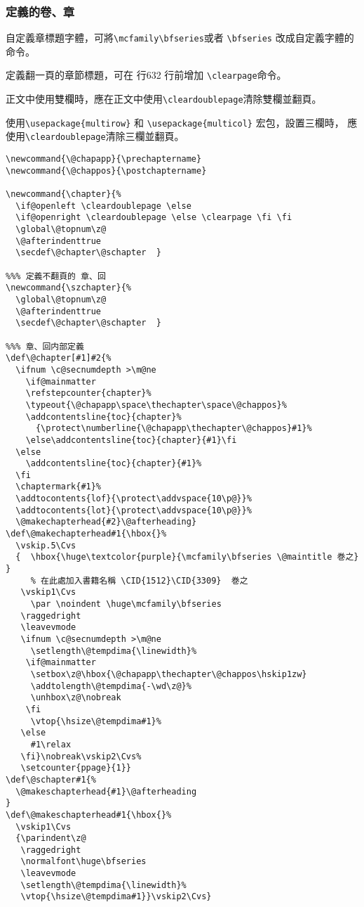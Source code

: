 \subsubsection{定義的卷、章}

\par 自定義章標題字體，可將\verb+\mcfamily\bfseries+或者 \verb+\bfseries+
改成自定義字體的命令。
\par 定義翻一頁的章節標題，可在 行632 行前增加 \verb+\clearpage+命令。
\par 正文中使用雙欄時，應在正文中使用\verb+\cleardoublepage+清除雙欄並翻頁。
\par 使用\verb+\usepackage{multirow}+ 和 \verb+\usepackage{multicol}+ 宏包，設置三欄時，
應使用\verb+\cleardoublepage+清除三欄並翻頁。
\begin{lstlisting}[firstnumber=620]
\newcommand{\@chapapp}{\prechaptername}
\newcommand{\@chappos}{\postchaptername}

\newcommand{\chapter}{%
  \if@openleft \cleardoublepage \else
  \if@openright \cleardoublepage \else \clearpage \fi \fi
  \global\@topnum\z@
  \@afterindenttrue
  \secdef\@chapter\@schapter  }

%%% 定義不翻頁的 章、回
\newcommand{\szchapter}{%
  \global\@topnum\z@
  \@afterindenttrue
  \secdef\@chapter\@schapter  }

%%% 章、回内部定義
\def\@chapter[#1]#2{%
  \ifnum \c@secnumdepth >\m@ne
    \if@mainmatter
    \refstepcounter{chapter}%
    \typeout{\@chapapp\space\thechapter\space\@chappos}%
    \addcontentsline{toc}{chapter}%
      {\protect\numberline{\@chapapp\thechapter\@chappos}#1}%
    \else\addcontentsline{toc}{chapter}{#1}\fi
  \else
    \addcontentsline{toc}{chapter}{#1}%
  \fi
  \chaptermark{#1}%
  \addtocontents{lof}{\protect\addvspace{10\p@}}%
  \addtocontents{lot}{\protect\addvspace{10\p@}}%
  \@makechapterhead{#2}\@afterheading}
\def\@makechapterhead#1{\hbox{}%
  \vskip.5\Cvs
  {  \hbox{\huge\textcolor{purple}{\mcfamily\bfseries \@maintitle 巻之} }
  	 % 在此處加入書籍名稱 \CID{1512}\CID{3309}  巻之
   \vskip1\Cvs
     \par \noindent \huge\mcfamily\bfseries
   \raggedright
   \leavevmode
   \ifnum \c@secnumdepth >\m@ne
     \setlength\@tempdima{\linewidth}%
    \if@mainmatter
     \setbox\z@\hbox{\@chapapp\thechapter\@chappos\hskip1zw}
     \addtolength\@tempdima{-\wd\z@}%
     \unhbox\z@\nobreak
    \fi
     \vtop{\hsize\@tempdima#1}%
   \else
     #1\relax
   \fi}\nobreak\vskip2\Cvs%
   \setcounter{ppage}{1}}
\def\@schapter#1{%
  \@makeschapterhead{#1}\@afterheading
}
\def\@makeschapterhead#1{\hbox{}%
  \vskip1\Cvs
  {\parindent\z@
   \raggedright
   \normalfont\huge\bfseries
   \leavevmode
   \setlength\@tempdima{\linewidth}%
   \vtop{\hsize\@tempdima#1}}\vskip2\Cvs}
\end{lstlisting}


